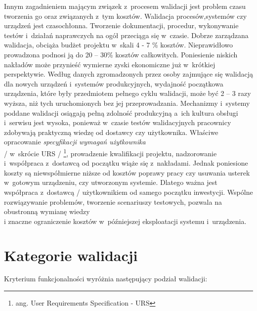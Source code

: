 \documentclass{xmgr}
\begin{document}
\indent Innym zagadnieniem mającym związek z~procesem walidacji jest problem czasu tworzenia go oraz związanych z~tym kosztów. Walidacja procesów,systemów czy urządzeń jest czasochłonna. Tworzenie dokumentacji, procedur, wykonywanie testów i~działań naprawczych na ogół przeciąga się w~czasie. Dobrze zarządzana walidacja, obciąża budżet projektu w~skali 4 - 7 \% kosztów. Nieprawidłowo prowadzona podnosi ją do 20 – 30\% kosztów całkowitych. Poniesienie niskich nakładów może przynieść wymierne zyski ekonomiczne już w~krótkiej perspektywie. Według danych zgromadzonych przez osoby zajmujące się walidacją dla nowych urządzeń i~systemów produkcyjnych, wydajność początkowa urządzenia, które były przedmiotem pełnego cyklu walidacji, może być 2 – 3 razy wyższa, niż tych uruchomionych bez jej przeprowadzania. Mechanizmy i~systemy poddane walidacji osiągają pełną zdolność produkcyjną a~ich kultura obsługi i~serwisu jest wysoka, ponieważ w~czasie testów walidacyjnych pracownicy zdobywają praktyczną wiedzę od dostawcy czy użytkownika. Właściwe opracowanie \textit{specyfikacji wymagań użytkownika}
\\
/ w~skrócie URS / \footnote{ang. User Requirements Specification - URS}, prowadzenie kwalifikacji projektu, nadzorowanie i~współpraca z~dostawcą od początku wiąże się z~nakładami. Jednak poniesione koszty są niewspółmierne niższe od kosztów poprawy pracy czy usuwania usterek w~gotowym urządzeniu, czy utworzonym systemie. Dlatego ważna jest współpraca z~dostawcą / użytkownikiem  od samego początku inwestycji. Wspólne rozwiązywanie problemów, tworzenie scenariuszy testowych, pozwala na obustronną wymianę wiedzy
\\
i znaczne ograniczenie kosztów w~późniejszej eksploatacji systemu i~urządzenia.\cite{ekonomia}

\section{Kategorie walidacji}

Kryterium funkcjonalności wyróżnia następujący podział walidacji:
\end{document}
